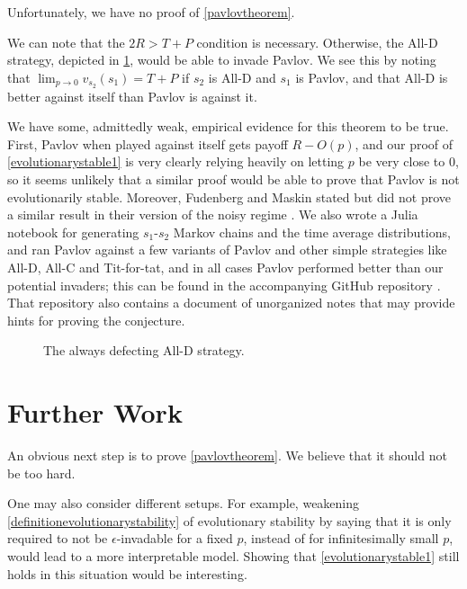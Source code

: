 \documentclass[11pt]{amsart}
\theoremstyle{definition}
\theoremstyle{remark}
\begin{document}
    Unfortunately, we have no proof of \cref{pavlovtheorem}.

    We can note that the $2R > T + P$ condition is necessary. Otherwise, the All-D strategy, depicted in \cref{figurealld}, would be able to invade Pavlov. We see this by noting that $\lim_{p \to 0} v_{s_2}(s_1) = T + P$ if $s_2$ is All-D and $s_1$ is Pavlov, and that All-D is better against itself than Pavlov is against it.

    We have some, admittedly weak, empirical evidence for this theorem to be true. First, Pavlov when played against itself gets payoff $R - O(p)$, and our proof of \cref{evolutionarystable1} is very clearly relying heavily on letting $p$ be very close to 0, so it seems unlikely that a similar proof would be able to prove that Pavlov is not evolutionarily stable. Moreover, Fudenberg and Maskin stated but did not prove a similar result in their version of the noisy regime \cite{fundenberg1990evolution}. We also wrote a Julia notebook for generating $s_1$-$s_2$ Markov chains and the time average distributions, and ran Pavlov against a few variants of Pavlov and other simple strategies like All-D, All-C and Tit-for-tat, and in all cases Pavlov performed better than our potential invaders; this can be found in the accompanying GitHub repository \cite{arvid2020}. That repository also contains a document of unorganized notes that may provide hints for proving the conjecture.

\begin{figure}
  \centering
  \caption{The always defecting All-D strategy.}
  \label{figurealld}
\end{figure}


    \section{Further Work}
    \label{sectiondiscussion}

    An obvious next step is to prove \cref{pavlovtheorem}. We believe that it should not be too hard.

    One may also consider different setups. For example, weakening \cref{definitionevolutionarystability} of evolutionary stability by saying that it is only required to not be $\epsilon$-invadable for a fixed $p$, instead of for infinitesimally small $p$, would lead to a more interpretable model. Showing that \cref{evolutionarystable1} still holds in this situation would be interesting.
    
\end{document}
